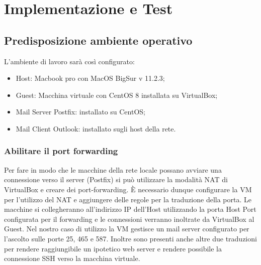\chapter{Implementazione e Test}

\section{Predisposizione ambiente operativo}

L'ambiente di lavoro sarà così configurato:

\begin{itemize}
    \item Host: Macbook pro con MacOS BigSur v 11.2.3;
    \item Guest: Macchina virtuale con CentOS 8 installata su VirtualBox;
    \item Mail Server Postfix: installato su CentOS;
    \item Mail Client Outlook: installato sugli host della rete.
\end{itemize}

\subsection{Abilitare il port forwarding}
Per fare in modo che le macchine della rete locale possano avviare una connessione
verso il server (Postfix) si può utilizzare la modalità NAT di VirtualBox e creare dei 
port-forwarding. È necessario dunque configurare la VM per l'utilizzo del NAT e aggiungere delle regole
per la traduzione della porta.
Le macchine si collegheranno all'indirizzo IP dell'Host utilizzando la porta Host Port configurata
per il forwarding e le connessioni verranno inoltrate da VirtualBox al Guest.
Nel nostro caso di utilizzo la VM gestisce un mail server configurato per l'ascolto sulle porte 25, 465 e
587. Inoltre sono presenti anche altre due traduzioni per rendere raggiungibile un ipotetico web server e rendere possibile
la connessione SSH verso la macchina virtuale.

\begin{table}[htp]
    \centering
    \end{table}

